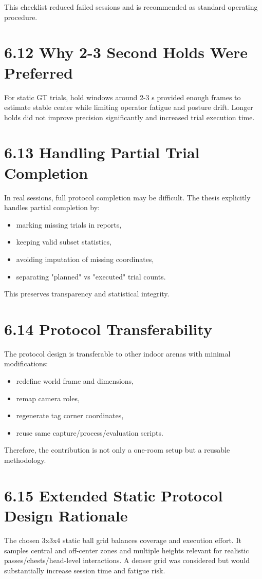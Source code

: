 This checklist reduced failed sessions and is recommended as standard operating procedure.

\section{6.12 Why 2-3 Second Holds Were Preferred}
For static GT trials, hold windows around 2-3 s provided enough frames to estimate stable center while limiting operator fatigue and posture drift. Longer holds did not improve precision significantly and increased trial execution time.

\section{6.13 Handling Partial Trial Completion}
In real sessions, full protocol completion may be difficult. The thesis explicitly handles partial completion by:
\begin{itemize}
  \item marking missing trials in reports,
  \item keeping valid subset statistics,
  \item avoiding imputation of missing coordinates,
  \item separating "planned" vs "executed" trial counts.
\end{itemize}

This preserves transparency and statistical integrity.

\section{6.14 Protocol Transferability}
The protocol design is transferable to other indoor arenas with minimal modifications:
\begin{itemize}
  \item redefine world frame and dimensions,
  \item remap camera roles,
  \item regenerate tag corner coordinates,
  \item reuse same capture/process/evaluation scripts.
\end{itemize}

Therefore, the contribution is not only a one-room setup but a reusable methodology.



\section{6.15 Extended Static Protocol Design Rationale}
The chosen 3x3x4 static ball grid balances coverage and execution effort. It samples central and off-center zones and multiple heights relevant for realistic passes/chests/head-level interactions. A denser grid was considered but would substantially increase session time and fatigue risk.

